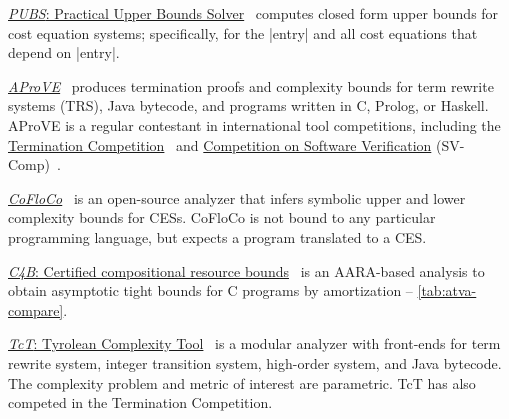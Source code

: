 \begin{description}

\item \href{https://costa.fdi.ucm.es/~costa/pubs/pubs.php}{\emph{PUBS}: Practical Upper Bounds Solver}~\cite{albert2010}
      computes closed form upper bounds for cost equation systems;
      specifically, for the \pr|entry| and all cost equations that depend on \pr|entry|.

\item \href{https://aprove.informatik.rwth-aachen.de}{\emph{AProVE}}~\cite{giesl2017}
      produces termination proofs and complexity bounds for
      term rewrite systems (TRS),
      Java bytecode,
      and programs written in
      C,
      Prolog, or
      Haskell.
      AProVE is a regular contestant in international tool competitions, including the
      \href{https://termination-portal.org/wiki/Termination_Competition}{Termination Competition}~\cite{giesl2019}
      and \href{https://sv-comp.sosy-lab.org/}{Competition on Software Verification} (SV-Comp)~\cite{beyer2022}.

\item \href{https://github.com/aeflores/CoFloCo}{\emph{CoFloCo}}~\cite{floresmontoya2014}
      is an open-source analyzer that infers symbolic upper and lower complexity bounds for CESs.
      CoFloCo is not bound to any particular programming language, but expects a program translated to a CES.

\item \href{https://www.cs.yale.edu/homes/qcar/aaa/}{\emph{C4B}:
      Certified compositional resource bounds}~\cite{carbonneaux2015}
      is an AARA-based analysis to obtain asymptotic tight bounds for C programs
      by amortization -- \autoref{tab:atva-compare}.

\item  \href{http://cl-informatik.uibk.ac.at/software/tct/}{\emph{TcT}: Tyrolean Complexity Tool}~\cite{avanzini2016}
       is a modular analyzer with front-ends for term rewrite system, integer transition system, high-order system, and Java bytecode.
       The complexity problem and metric of interest are parametric.
       TcT has also competed in the Termination Competition.


\end{description}

